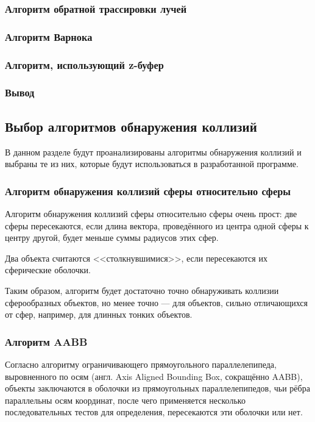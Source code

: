 \subsubsection{Алгоритм обратной трассировки лучей}

\subsubsection{Алгоритм Варнока}

\subsubsection{Алгоритм, использующий z-буфер}

\subsubsection*{Вывод}

\subsection{Выбор алгоритмов обнаружения коллизий}

В данном разделе будут проанализированы алгоритмы обнаружения коллизий и выбраны те из них, которые будут использоваться в разработанной программе.

\subsubsection{Алгоритм обнаружения коллизий сферы относительно сферы}

Алгоритм обнаружения коллизий сферы относительно сферы очень прост: две сферы пересекаются, если длина вектора, проведённого из центра одной сферы к центру другой, будет меньше суммы радиусов этих сфер. %

Два объекта считаются <<столкнувшимися>>, если пересекаются их сферические оболочки.

Таким образом, алгоритм будет достаточно точно обнаруживать коллизии сферообразных объектов, но менее точно --- для объектов, сильно отличающихся от сфер, например, для длинных тонких объектов.

\subsubsection{Алгоритм AABB}

Согласно алгоритму ограничивающего прямоугольного параллелепипеда, выровненного по осям (англ. Axis Aligned Bounding Box, сокращённо AABB), объекты заключаются в оболочки из прямоугольных параллелепипедов, чьи рёбра параллельны осям координат, после чего применяется несколько последовательных тестов для определения, пересекаются эти оболочки или нет. %

